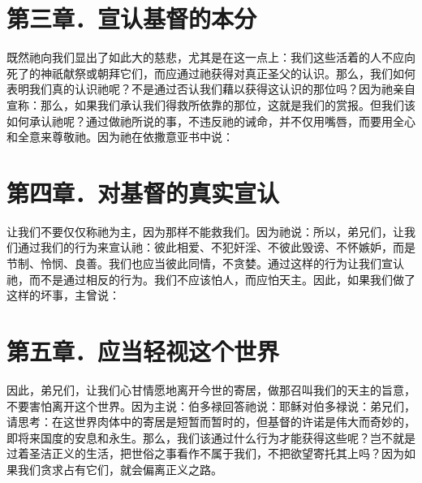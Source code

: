
\section{第三章．宣认基督的本分}

既然祂向我们显出了如此大的慈悲，尤其是在这一点上：我们这些活着的人不应向死了的神祇献祭或朝拜它们，而应通过祂获得对真正圣父的认识。那么，我们如何表明我们真的认识祂呢？不是通过否认我们藉以获得这认识的那位吗？因为祂亲自宣称：那么，如果我们承认我们得救所依靠的那位，这就是我们的赏报。但我们该如何承认祂呢？通过做祂所说的事，不违反祂的诫命，并不仅用嘴唇，而要用全心和全意来尊敬祂。因为祂在依撒意亚书中说：\par


\section{第四章．对基督的真实宣认}

让我们不要仅仅称祂为主，因为那样不能救我们。因为祂说：所以，弟兄们，让我们通过我们的行为来宣认祂：彼此相爱、不犯奸淫、不彼此毁谤、不怀嫉妒，而是节制、怜悯、良善。我们也应当彼此同情，不贪婪。通过这样的行为让我们宣认祂，而不是通过相反的行为。我们不应该怕人，而应怕天主。因此，如果我们做了这样的坏事，主曾说：\par


\section{第五章．应当轻视这个世界}

因此，弟兄们，让我们心甘情愿地离开今世的寄居，做那召叫我们的天主的旨意，不要害怕离开这个世界。因为主说：伯多禄回答祂说：耶稣对伯多禄说：弟兄们，请思考：在这世界肉体中的寄居是短暂而暂时的，但基督的许诺是伟大而奇妙的，即将来国度的安息和永生。那么，我们该通过什么行为才能获得这些呢？岂不就是过着圣洁正义的生活，把世俗之事看作不属于我们，不把欲望寄托其上吗？因为如果我们贪求占有它们，就会偏离正义之路。\par

